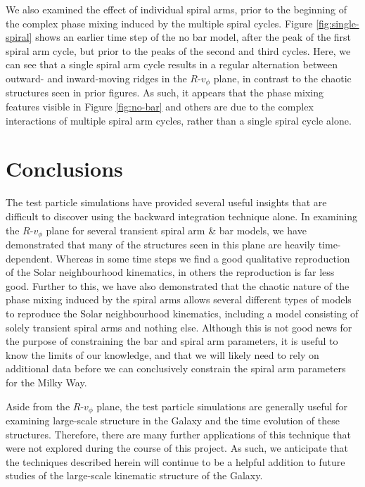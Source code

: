 \documentclass[10pt]{article}
\begin{document}
We also examined the effect of individual spiral arms, prior to the beginning of the complex phase mixing induced by the multiple spiral cycles. Figure \ref{fig:single-spiral} shows an earlier time step of the no bar model, after the peak of the first spiral arm cycle, but prior to the peaks of the second and third cycles. Here, we can see that a single spiral arm cycle results in a regular alternation between outward- and inward-moving ridges in the $R$-$v_\phi$ plane, in contrast to the chaotic structures seen in prior figures. As such, it appears that the phase mixing features visible in Figure \ref{fig:no-bar} and others are due to the complex interactions of multiple spiral arm cycles, rather than a single spiral cycle alone. 

\section{Conclusions}
The test particle simulations have provided several useful insights that are difficult to discover using the backward integration technique alone. In examining the $R$-$v_\phi$ plane for several transient spiral arm \& bar models, we have demonstrated that many of the structures seen in this plane are heavily time-dependent. Whereas in some time steps we find a good qualitative reproduction of the Solar neighbourhood kinematics, in others the reproduction is far less good. Further to this, we have also demonstrated that the chaotic nature of the phase mixing induced by the spiral arms allows several different types of models to reproduce the Solar neighbourhood kinematics, including a model consisting of solely transient spiral arms and nothing else. Although this is not good news for the purpose of constraining the bar and spiral arm parameters, it is useful to know the limits of our knowledge, and that we will likely need to rely on additional data before we can conclusively constrain the spiral arm parameters for the Milky Way.

Aside from the $R$-$v_\phi$ plane, the test particle simulations are generally useful for examining large-scale structure in the Galaxy and the time evolution of these structures. Therefore, there are many further applications of this technique that were not explored during the course of this project. As such, we anticipate that the techniques described herein will continue to be a helpful addition to future studies of the large-scale kinematic structure of the Galaxy.

\printbibliography
\end{document}
